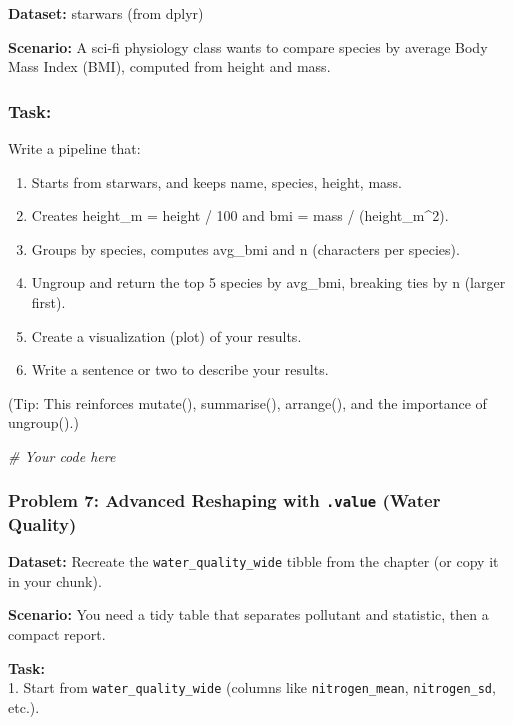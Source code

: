 \documentclass[
  11pt,
]{article}
\newenvironment{Shaded}{\begin{snugshade}}{\end{snugshade}}
\newcommand{\CommentTok}[1]{\textcolor[rgb]{0.56,0.35,0.01}{\textit{#1}}}
\begin{document}
\textbf{Dataset:} starwars (from dplyr)

\textbf{Scenario:} A sci‑fi physiology class wants to compare species by
average Body Mass Index (BMI), computed from height and mass.

\subsubsection{Task:}\label{task}

Write a pipeline that:

\begin{enumerate}
\def\labelenumi{\arabic{enumi}.}
\item
  Starts from starwars, and keeps name, species, height, mass.
\item
  Creates height\_m = height / 100 and bmi = mass / (height\_m\^{}2).
\item
  Groups by species, computes avg\_bmi and n (characters per species).
\item
  Ungroup and return the top 5 species by avg\_bmi, breaking ties by n
  (larger first).
\item
  Create a visualization (plot) of your results.
\item
  Write a sentence or two to describe your results.
\end{enumerate}

(Tip: This reinforces mutate(), summarise(), arrange(), and the
importance of ungroup().)

\begin{Shaded}
\begin{Highlighting}[]
\CommentTok{\# Your code here}
\end{Highlighting}
\end{Shaded}

\subsubsection{\texorpdfstring{Problem 7: Advanced Reshaping with
\texttt{.value} (Water
Quality)}{Problem 7: Advanced Reshaping with .value (Water Quality)}}\label{problem-7-advanced-reshaping-with-.value-water-quality}

\textbf{Dataset:} Recreate the \texttt{water\_quality\_wide} tibble from
the chapter (or copy it in your chunk).

\textbf{Scenario:} You need a tidy table that separates pollutant and
statistic, then a compact report.

\textbf{Task:}\\
1. Start from \texttt{water\_quality\_wide} (columns like
\texttt{nitrogen\_mean}, \texttt{nitrogen\_sd}, etc.).
\end{document}
